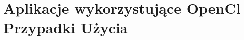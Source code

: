 \section[Aplikacje wykorzystujące OpenCl Przypadki Użycia]{Aplikacje wykorzystujące OpenCl Przypadki Użycia}

